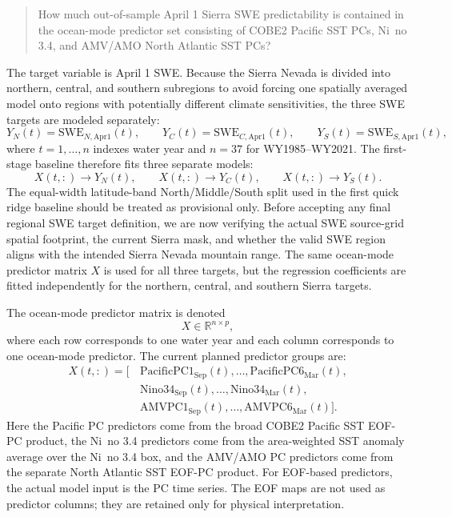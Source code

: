 \documentclass[11pt]{article}
\begin{document}
\begin{quote}
How much out-of-sample April 1 Sierra SWE predictability is contained in the ocean-mode predictor
set consisting of COBE2 Pacific SST PCs, Ni~no 3.4, and AMV/AMO North Atlantic SST PCs?
\end{quote}

The target variable is April 1 SWE. Because the Sierra Nevada is divided into northern, central, and
southern subregions to avoid forcing one spatially averaged model onto regions with potentially
different climate sensitivities, the three SWE targets are modeled separately:
\[
Y_N(t) = \mathrm{SWE}_{N,\mathrm{Apr1}}(t),
\qquad
Y_C(t) = \mathrm{SWE}_{C,\mathrm{Apr1}}(t),
\qquad
Y_S(t) = \mathrm{SWE}_{S,\mathrm{Apr1}}(t),
\]
where $t=1,\ldots,n$ indexes water year and $n=37$ for WY1985--WY2021. The first-stage
baseline therefore fits three separate models:
\[
X(t,:) \rightarrow Y_N(t),
\qquad
X(t,:) \rightarrow Y_C(t),
\qquad
X(t,:) \rightarrow Y_S(t).
\]
The equal-width latitude-band North/Middle/South split used in the first quick ridge baseline
should be treated as provisional only. Before accepting any final regional SWE target definition,
we are now verifying the actual SWE source-grid spatial footprint, the current Sierra mask, and
whether the valid SWE region aligns with the intended Sierra Nevada mountain range.
The same ocean-mode predictor matrix $X$ is used for all three targets, but the regression
coefficients are fitted independently for the northern, central, and southern Sierra targets.

The ocean-mode predictor matrix is denoted
\[
X \in \mathbb{R}^{n \times p},
\]
where each row corresponds to one water year and each column corresponds to one ocean-mode predictor.
The current planned predictor groups are:
\[
\begin{split}
X(t,:) = [&\,\mathrm{PacificPC1}_{\mathrm{Sep}}(t), \ldots, \mathrm{PacificPC6}_{\mathrm{Mar}}(t), \\
&\,\mathrm{Nino34}_{\mathrm{Sep}}(t), \ldots, \mathrm{Nino34}_{\mathrm{Mar}}(t), \\
&\,\mathrm{AMVPC1}_{\mathrm{Sep}}(t), \ldots, \mathrm{AMVPC6}_{\mathrm{Mar}}(t)].
\end{split}
\]
Here the Pacific PC predictors come from the broad COBE2 Pacific SST EOF-PC product, the Ni~no 3.4
predictors come from the area-weighted SST anomaly average over the Ni~no 3.4 box, and the AMV/AMO
PC predictors come from the separate North Atlantic SST EOF-PC product. For EOF-based predictors,
the actual model input is the PC time series. The EOF maps are not used as predictor columns; they
are retained only for physical interpretation.
\end{document}
